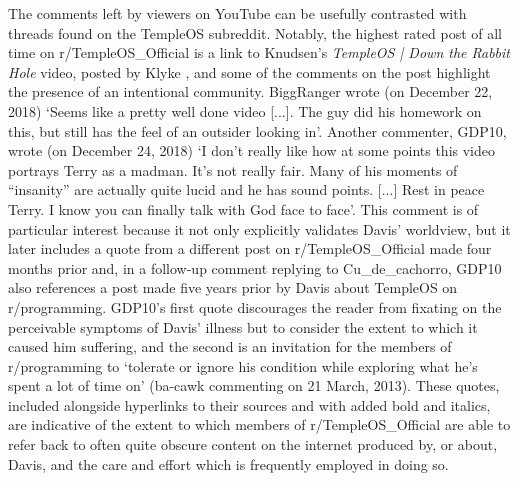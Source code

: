 \documentclass[Draft.tex]{subfiles}
\begin{document}
The comments left by viewers on YouTube can be usefully contrasted
with threads found on the TempleOS subreddit\footnotemark.
Notably, the highest rated post of all time on r/TempleOS\_Official
is a link to Knudsen's \textit{TempleOS | Down the Rabbit Hole} video,
posted by Klyke \parencite*{Klyke18},
and some of the comments on the post highlight the presence of
an intentional community.
BiggRanger wrote (on December 22, 2018)
`Seems like a pretty well done video [...].  The guy did his homework on this,
but still has the feel of an outsider looking in'.
Another commenter, GDP10, wrote (on December 24, 2018)
`I don't really like how at some points this video portrays Terry as a madman.
It's not really fair.  Many of his moments of ``insanity''
are actually quite lucid and he has sound points. [...]
Rest in peace Terry.  I know you can finally talk with God face to face'.
This comment is of particular interest because it not only explicitly validates
Davis' worldview, but it later includes a quote from a different post on
r/TempleOS\_Official made four months prior and,
in a follow-up comment replying to Cu\_de\_cachorro, GDP10 also references
a post made five years prior by Davis \parencite*{Davis13}
about TempleOS on r/programming.
GDP10's first quote discourages the reader from fixating on the perceivable
symptoms of Davis' illness but to consider the extent to which it caused him
suffering, and the second is an invitation for the members of r/programming
to `tolerate or ignore his condition
while exploring what he's spent a lot of time on'
(ba-cawk commenting on 21 March, 2013).
These quotes, included alongside hyperlinks to their sources and with added bold and italics,
are indicative of the extent to which members of r/TempleOS\_Official
are able to refer back to often quite obscure content on the internet produced
by, or about, Davis, and the care and effort which is frequently employed
in doing so.
\end{document}
